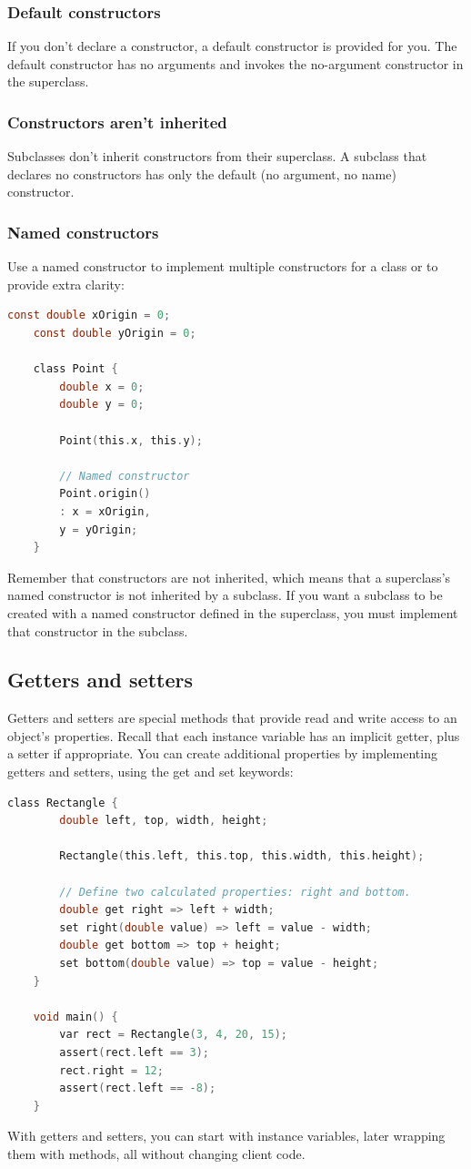 \subsubsection{Default constructors}
If you don't declare a constructor, a default constructor is provided for you. The default constructor has no arguments and invokes the no-argument constructor in the superclass.

\subsubsection{Constructors aren't inherited}
Subclasses don't inherit constructors from their superclass. A subclass that declares no constructors has only the default (no argument, no name) constructor.
\subsubsection{Named constructors}
Use a named constructor to implement multiple constructors for a class or to provide extra clarity:
\begin{lstlisting}[language=C]
	const double xOrigin = 0;
	const double yOrigin = 0;
	
	class Point {
		double x = 0;
		double y = 0;
		
		Point(this.x, this.y);
		
		// Named constructor
		Point.origin()
		: x = xOrigin,
		y = yOrigin;
	}
\end{lstlisting}
Remember that constructors are not inherited, which means that a superclass's named constructor is not inherited by a subclass. If you want a subclass to be created with a named constructor defined in the superclass, you must implement that constructor in the subclass.
\subsection{Getters and setters}
Getters and setters are special methods that provide read and write access to an object's properties. Recall that each instance variable has an implicit getter, plus a setter if appropriate. You can create additional properties by implementing getters and setters, using the get and set keywords:
\begin{lstlisting}[language=C]
	class Rectangle {
		double left, top, width, height;
		
		Rectangle(this.left, this.top, this.width, this.height);
		
		// Define two calculated properties: right and bottom.
		double get right => left + width;
		set right(double value) => left = value - width;
		double get bottom => top + height;
		set bottom(double value) => top = value - height;
	}
	
	void main() {
		var rect = Rectangle(3, 4, 20, 15);
		assert(rect.left == 3);
		rect.right = 12;
		assert(rect.left == -8);
	}
\end{lstlisting}
With getters and setters, you can start with instance variables, later wrapping them with methods, all without changing client code.
